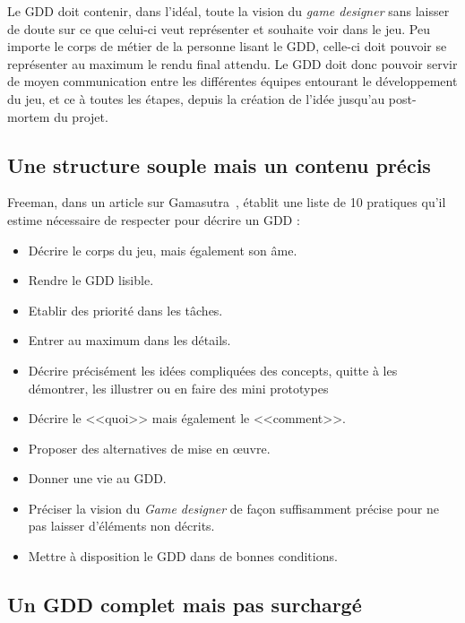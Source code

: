 Le GDD doit contenir, dans l'idéal, toute la vision du \emph{game designer} sans laisser de doute sur ce que celui-ci veut représenter et souhaite voir dans le jeu.
Peu importe le corps de métier de la personne lisant le GDD, celle-ci doit pouvoir se représenter au maximum le rendu final attendu.
Le GDD doit donc pouvoir servir de moyen communication entre les différentes équipes entourant le développement du jeu, et ce \`a toutes les étapes, depuis la création de l'idée jusqu'au post-mortem du projet.

\subsection{Une structure souple mais un contenu précis}


Freeman, dans un article sur Gamasutra~\cite{gama_greateGDD}, établit une liste de 10 pratiques qu'il estime nécessaire de respecter pour d\'ecrire un GDD :
\begin{itemize}
    \item Décrire le corps du jeu, mais également son âme.
    \item Rendre le GDD lisible.
    \item Etablir des priorité dans les tâches.
    \item Entrer au maximum dans les détails.
    \item Décrire précisément les idées compliquées des concepts, quitte à les démontrer, les illustrer ou en faire des mini prototypes 
    \item Décrire le <<quoi>> mais également le <<comment>>.
    \item Proposer des alternatives de mise en \oe{}uvre. 
    \item Donner une vie au GDD.
    \item Pr\'eciser la vision du \emph{Game designer} de fa\c{c}on suffisamment précise pour ne pas laisser d'éléments non décrits.
    \item Mettre à disposition le GDD dans de bonnes conditions.
\end{itemize}

\subsection{Un GDD complet mais pas surchargé}


